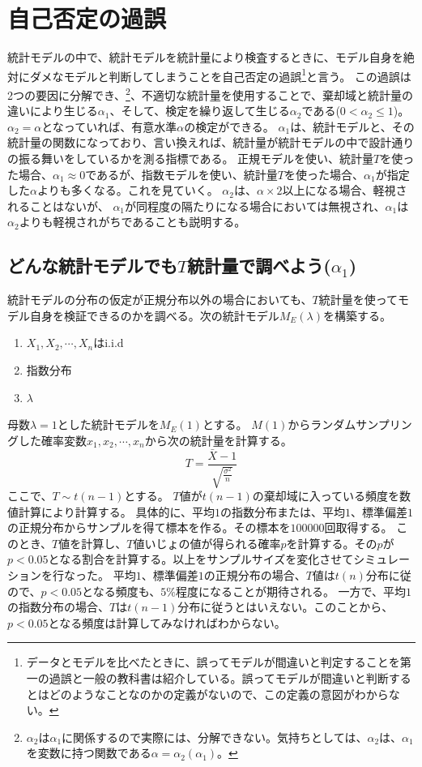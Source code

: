 \section{自己否定の過誤}
統計モデルの中で、統計モデルを統計量により検査するときに、モデル自身を絶対にダメなモデルと判断してしまうことを自己否定の過誤\footnote{データとモデルを比べたときに、誤ってモデルが間違いと判定することを第一の過誤と一般の教科書は紹介している。誤ってモデルが間違いと判断するとはどのようなことなのかの定義がないので、この定義の意図がわからない。}と言う。
この過誤は2つの要因に分解でき、\footnote{$\alpha_2$は$\alpha_1$に関係するので実際には、分解できない。気持ちとしては、$\alpha_2$は、$\alpha_1$を変数に持つ関数である$\alpha=\alpha_2(\alpha_1)$。}、不適切な統計量を使用することで、棄却域と統計量の違いにより生じる$\alpha_1$、そして、検定を繰り返して生じる$\alpha_2$である($0<\alpha_2 \leq 1$)。
$\alpha_2=\alpha$となっていれば、有意水準$\alpha$の検定ができる。
$\alpha_1$は、統計モデルと、その統計量の関数になっており、言い換えれば、統計量が統計モデルの中で設計通りの振る舞いをしているかを測る指標である。
正規モデルを使い、統計量$T$を使った場合、$\alpha_1 \approx	 0 $であるが、指数モデルを使い、統計量$T$を使った場合、$\alpha_1$が指定した$\alpha$よりも多くなる。これを見ていく。
$\alpha_2$は、$\alpha\times 2$以上になる場合、軽視されることはないが、
$\alpha_1$が同程度の隔たりになる場合においては無視され、$\alpha_1$は$\alpha_2$よりも軽視されがちであることも説明する。

\subsection{どんな統計モデルでも$T$統計量で調べよう($\alpha_1$)}
統計モデルの分布の仮定が正規分布以外の場合においても、$T$統計量を使ってモデル自身を検証できるのかを調べる。次の統計モデル$M_E(\lambda)$を構築する。
\begin{enumerate}
    \item $X_1,X_2,\cdots,X_n $はi.i.d
    \item 指数分布
    \item $\lambda$
\end{enumerate}
母数$\lambda=1$とした統計モデルを$M_E(1)$とする。
$M(1)$からランダムサンプリングした確率変数$x_1,x_2,\cdots,x_n$から次の統計量を計算する。
\begin{equation*}
    T = \frac{\bar{X}-1}{\sqrt{\frac{\sigma^2}{n}}}
\end{equation*}
ここで、$T \sim t(n-1)$とする。
$T$値が$t(n-1)$の棄却域に入っている頻度を数値計算により計算する。
具体的に、平均$1$の指数分布または、平均$1$、標準偏差$1$の正規分布からサンプルを得て標本を作る。その標本を$100000$回取得する。
このとき、$T$値を計算し、$T$値いじょの値が得られる確率$p$を計算する。その$p$が$p<0.05$となる割合を計算する。以上をサンプルサイズを変化させてシミュレーションを行なった。
平均$1$、標準偏差$1$の正規分布の場合、$T$値は$t(n)$分布に従ので、$p<0.05$となる頻度も、$5\%$程度になることが期待される。
一方で、平均$1$の指数分布の場合、$T$は$t(n-1)$分布に従うとはいえない。このことから、$p<0.05$となる頻度は計算してみなければわからない。


